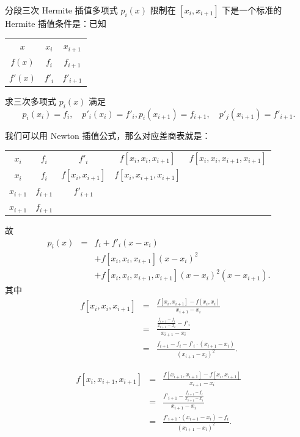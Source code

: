 \documentclass[a4paper]{ctexart}
\begin{document}
{

分段三次 Hermite 插值多项式 $p_i(x)$ 限制在 $[x_i, x_{i + 1}]$ 下是一个标准的 Hermite 插值条件是：已知

\begin{center}
\begin{tabular}{|c|c|c|}
  $x$ & $x_i$ & $x_{i + 1}$ \\
  $f(x)$ & $f_i$ & $f_{i + 1}$ \\
  $f'(x)$ & $f'_i$ & $f'_{i + 1}$
\end{tabular} 
\end{center}

求三次多项式 $p_i(x)$ 满足  
$$
p_i (x_i) = f_i, \quad p'_i (x_i) = f'_i, p_i (x_{i + 1}) = f_{i + 1}, \quad p'_j (x_{i + 1}) = f'_{i + 1}.
$$

我们可以用 Newton 插值公式，那么对应差商表就是：

\begin{center}
\begin{tabular}{|c|c|c|c|c|}
$x_i$ & $f_i$ & $f'_i$ & $f[x_i, x_i, x_{i + 1}]$ & $f[x_i, x_i, x_{i + 1}, x_{i + 1}]$ \\
$x_i$ & $f_i$ & $f[x_i, x_{i + 1}]$ & $f[x_i, x_{i + 1}, x_{i + 1}]$ & \\
$x_{i + 1}$ & $f_{i + 1}$ & $f'_{i + 1}$ & & \\
$x_{i + 1}$ & $f_{i + 1}$ &  &  &  
\end{tabular}
\end{center}

故
\begin{eqnarray*}
p_i(x) &=& f_i + f'_i(x - x_i) \\
&&+ f[x_i, x_i, x_{i + 1}](x - x_i)^2 \\
&&+ f[x_i, x_i, x_{i + 1}, x_{i + 1}](x - x_i)^2(x - x_{i + 1}).
\end{eqnarray*}
其中
\begin{eqnarray*}
  f[x_i, x_i, x_{i + 1}] &=& \frac{f[x_i, x_{i + 1}] - f[x_i, x_i]}{x_{i + 1} - x_{i}} \\
  &=& \frac{\frac{f_{i + 1} - f_i}{x_{i + 1} - x_i} - f'_i}{x_{i + 1} - x_{i}} \\
  &=& \frac{f_{i + 1} - f_i - f'_i \cdot (x_{i + 1} - x_i)}{(x_{i + 1} - x_i)^2}. 
\end{eqnarray*}

\begin{eqnarray*}
  f[x_i, x_{i + 1}, x_{i + 1}] &=& \frac{f[x_{i + 1}, x_{i + 1}] - f[x_i, x_{i + 1}]}{x_{i + 1} - x_{i}} \\
  &=& \frac{f'_{i + 1} - \frac{f_{i + 1} - f_i}{x_{i + 1} - x_i}}{x_{i + 1} - x_{i}} \\
  &=& \frac{f'_{i + 1} \cdot (x_{i + 1} - x_i) - f_i}{(x_{i + 1} - x_i)^2}. 
\end{eqnarray*}

}
\end{document}
